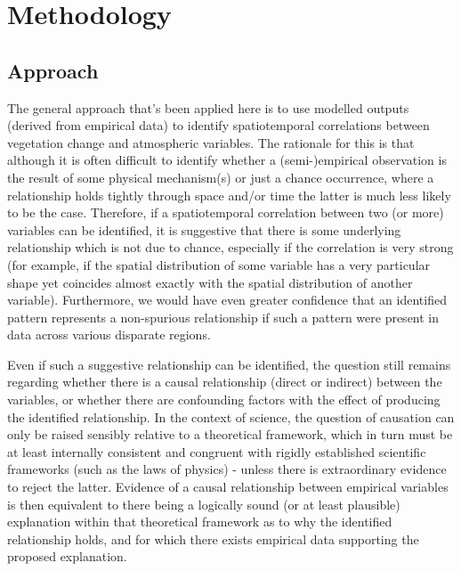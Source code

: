 \chapter{Methodology}

\section{Approach}

The general approach that's been applied here is to use modelled outputs (derived from empirical data) to identify spatiotemporal correlations between vegetation change and atmospheric variables. The rationale for this is that although it is often difficult to identify whether a (semi-)empirical observation is the result of some physical mechanism(s) or just a chance occurrence, where a relationship holds tightly through space and/or time the latter is much less likely to be the case. Therefore, if a spatiotemporal correlation between two (or more) variables can be identified, it is suggestive that there is some underlying relationship which is not due to chance, especially if the correlation is very strong (for example, if the spatial distribution of some variable has a very particular shape yet coincides almost exactly with the spatial distribution of another variable). Furthermore, we would have even greater confidence that an identified pattern represents a non-spurious relationship if such a pattern were present in data across various disparate regions.

Even if such a suggestive relationship can be identified, the question still remains regarding whether there is a causal relationship (direct or indirect) between the variables, or whether there are confounding factors with the effect of producing the identified relationship. In the context of science, the question of causation can only be raised sensibly relative to a theoretical framework, which in turn must be at least internally consistent and congruent with rigidly established scientific frameworks (such as the laws of physics) - unless there is extraordinary evidence to reject the latter. Evidence of a causal relationship between empirical variables is then equivalent to there being a logically sound (or at least plausible) explanation within that theoretical framework as to why the identified relationship holds, and for which there exists empirical data supporting the proposed explanation.

